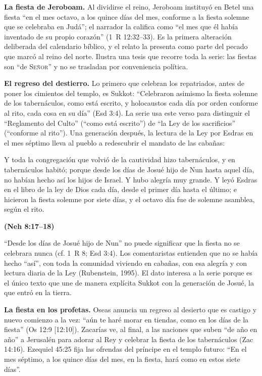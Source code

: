 \documentclass[11pt,letterpaper]{article}
\newcommand{\SENOR}{\textsc{Señor}}
\newcommand{\fuente}[1]{\par\hfill{\upshape\bfseries\small\textcolor{tierraroja}{#1}}}
\begin{document}
\textbf{La fiesta de Jeroboam.} Al dividirse el reino, Jeroboam instituyó en Betel una fiesta ``en el mes octavo, a los quince días del mes, conforme a la fiesta solemne que se celebraba en Judá''; el narrador la califica como ``el mes que él había inventado de su propio corazón'' (1~R 12:32--33). Es la primera alteración deliberada del calendario bíblico, y el relato la presenta como parte del pecado que marcó al reino del norte. Ilustra una tesis que recorre toda la serie: las fiestas son ``de \SENOR'' y no se trasladan por conveniencia política.

\textbf{El regreso del destierro.} Lo primero que celebran los repatriados, antes de poner los cimientos del templo, es Sukkot: ``Celebraron asimismo la fiesta solemne de los tabernáculos, como está escrito, y holocaustos cada día por orden conforme al rito, cada cosa en su día'' (Esd 3:4). La serie usa este verso para distinguir el ``Reglamento del Culto'' (``como está escrito'') de ``la Ley de los sacrificios'' (``conforme al rito''). Una generación después, la lectura de la Ley por Esdras en el mes séptimo lleva al pueblo a redescubrir el mandato de las cabañas:

\begin{cita}Y toda la congregación que volvió de la cautividad hizo tabernáculos, y en tabernáculos habitó; porque desde los días de Josué hijo de Nun hasta aquel día, no habían hecho así los hijos de Israel. Y hubo alegría muy grande. Y leyó Esdras en el libro de la ley de Dios cada día, desde el primer día hasta el último; e hicieron la fiesta solemne por siete días, y el octavo día fue de solemne asamblea, según el rito.\fuente{(Neh 8:17--18)}\end{cita}

``Desde los días de Josué hijo de Nun'' no puede significar que la fiesta no se celebrara nunca (cf. 1~R 8; Esd 3:4). Los comentaristas entienden que no se había hecho ``así'', con toda la comunidad viviendo en cabañas, con esa alegría y con lectura diaria de la Ley (Rubenstein, 1995). El dato interesa a la serie porque es el único texto que une de manera explícita Sukkot con la generación de Josué, la que entró en la tierra.

\textbf{La fiesta en los profetas.} Oseas anuncia un regreso al desierto que es castigo y nuevo comienzo a la vez: ``aún te haré morar en tiendas, como en los días de la fiesta'' (Os 12:9 [12:10]). Zacarías ve, al final, a las naciones que suben ``de año en año'' a Jerusalén para adorar al Rey y celebrar la fiesta de los tabernáculos (Zac 14:16). Ezequiel 45:25 fija las ofrendas del príncipe en el templo futuro: ``En el mes séptimo, a los quince días del mes, en la fiesta, hará como en estos siete días''.
\end{document}
